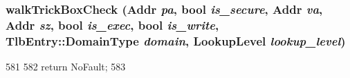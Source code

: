 \label{classArmISA_1_1TLB_a3e576c3e0d39dfca708baea44ebf0617}
\hypertarget{classArmISA_1_1TLB_a19bf31f32ec6125d85acc1feeee28e47}{
\subsubsection[{walkTrickBoxCheck}]{ walkTrickBoxCheck ({\bf Addr} {\em pa}, \/  bool {\em is\_\-secure}, \/  {\bf Addr} {\em va}, \/  {\bf Addr} {\em sz}, \/  bool {\em is\_\-exec}, \/  bool {\em is\_\-write}, \/  {\bf TlbEntry::DomainType} {\em domain}, \/  {\bf LookupLevel} {\em lookup\_\-level})}}
\label{classArmISA_1_1TLB_a19bf31f32ec6125d85acc1feeee28e47}



\begin{DoxyCode}
581 {
582     return NoFault;
583 }
\end{DoxyCode}


